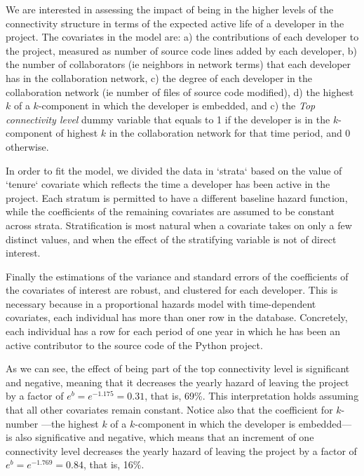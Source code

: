 We are interested in assessing the impact of being in the higher levels of the connectivity structure in terms of the expected active life of a developer in the project. The covariates in the model are: a) the contributions of each developer to the project, measured as number of source code lines added by each developer, b) the number of collaborators (ie neighbors in network terms) that each developer has in the collaboration network, c) the degree of each developer in the collaboration network (ie number of files of source code modified), d) the highest $k$ of a $k$-component in which the developer is embedded, and c) the \emph{Top connectivity level} dummy variable that equals to 1 if the developer is in the $k$-component of highest $k$ in the collaboration network for that time period, and 0 otherwise.



In order to fit the model, we divided the data in `strata` based on the value of `tenure` covariate which reflects the time a developer has been active in the project. Each stratum is permitted to have a different baseline hazard function, while the coefficients of the remaining covariates are assumed to be constant across strata. Stratification is most natural when a covariate takes on only a few distinct values, and when the effect of the stratifying variable is not of direct interest.

Finally the estimations of the variance and standard errors of the coefficients of the covariates of interest are robust, and clustered for each developer. This is necessary because in a proportional hazards model with time-dependent covariates, each individual has more than oner row in the database. Concretely, each individual has a row for each period of one year in which he has been an active contributor to the source code of the Python project.

As we can see, the effect of being part of the top connectivity level is significant and negative, meaning that it decreases the yearly hazard of leaving the project by a factor of $e^b = e^{-1.175} = 0.31$, that is, 69\%. This interpretation holds assuming that all other covariates remain constant. Notice also that the coefficient for $k$-number ---the highest $k$ of a $k$-component in which the developer is embedded--- is also significative and negative, which means that an increment of one connectivity level decreases the yearly hazard of leaving the project by a factor of $e^b = e^{-1.769} = 0.84$, that is, 16\%.

